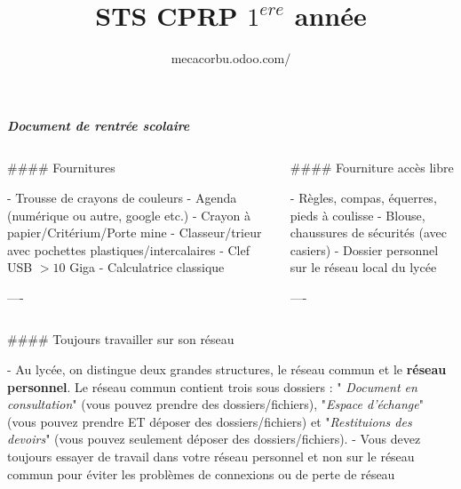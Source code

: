 \documentclass{beamer}
\author[Chevalier.V]{mecacorbu.odoo.com/}
\title{STS CPRP $1^{ere}$ année}
\institute{Lycée Le Corbusier}
\begin{document}
\begin{frame}[fragile]\centering

\textbf{\textit{Document de rentrée scolaire}}

\begin{columns}
\begin{column}{0.57\textwidth}

\begin{markdown}

#### Fournitures

- Trousse de crayons de couleurs
- Agenda (numérique ou autre, google etc.)
- Crayon à papier/Critérium/Porte mine
- Classeur/trieur avec pochettes plastiques/intercalaires
- Clef USB $> 10$ Giga 
- Calculatrice classique


----
\end{markdown}
\end{column}


\begin{column}{.4\textwidth}
\begin{markdown}




#### Fourniture accès libre

- Règles, compas, équerres, pieds à coulisse
- Blouse, chaussures de sécurités (avec casiers)
- Dossier personnel sur le réseau local du lycée



----
\end{markdown}
\end{column}

\end{columns}

\bigskip
{\hrulefill}
\bigskip

\begin{columns}[T]

\begin{column}{.46\textwidth}

\begin{markdown}

#### Toujours travailler sur son réseau

- Au lycée, on distingue deux grandes structures, le réseau commun et le \textbf{réseau personnel}. Le réseau commun contient trois sous dossiers : "\textit{ Document en consultation}" (vous pouvez prendre des dossiers/fichiers), "\textit{Espace d’échange}" (vous pouvez prendre ET déposer des dossiers/fichiers) et "\textit{Restituions des devoirs}" (vous pouvez seulement déposer des dossiers/fichiers).
- Vous devez toujours essayer de travail dans votre réseau personnel et non sur le réseau commun pour
éviter les problèmes de connexions ou de perte de réseau


\end{markdown}
\end{column}
\end{columns}
\end{frame}
\end{document}
